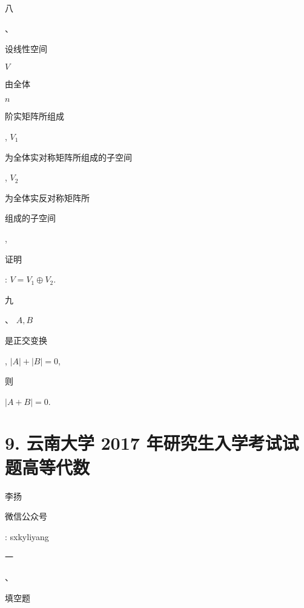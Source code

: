 \documentclass[10pt]{article}
\begin{document}
\begin{CJK}{UTF8}{mj}八\end{CJK}、\begin{CJK}{UTF8}{mj}设线性空间\end{CJK} $V$ \begin{CJK}{UTF8}{mj}由全体\end{CJK} $n$ \begin{CJK}{UTF8}{mj}阶实矩阵所组成\end{CJK}, $V_{1}$ \begin{CJK}{UTF8}{mj}为全体实对称矩阵所组成的子空间\end{CJK}, $V_{2}$ \begin{CJK}{UTF8}{mj}为全体实反对称矩阵所\end{CJK} \begin{CJK}{UTF8}{mj}组成的子空间\end{CJK}, \begin{CJK}{UTF8}{mj}证明\end{CJK}: $V=V_{1} \oplus V_{2}$.

\begin{CJK}{UTF8}{mj}九\end{CJK}、 $A, B$ \begin{CJK}{UTF8}{mj}是正交变换\end{CJK}, $|A|+|B|=0$, \begin{CJK}{UTF8}{mj}则\end{CJK} $|A+B|=0$.

\section{9. 云南大学 2017 年研究生入学考试试题高等代数}
\begin{CJK}{UTF8}{mj}李扬\end{CJK}

\begin{CJK}{UTF8}{mj}微信公众号\end{CJK}: sxkyliyang

\begin{CJK}{UTF8}{mj}一\end{CJK}、\begin{CJK}{UTF8}{mj}填空题\end{CJK}
\end{document}
